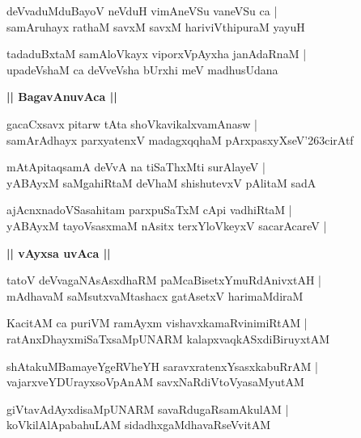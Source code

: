 \documentclass[twoside,12pt,openright]{book}
\def\S{\char'263}
\newcounter{shloka}[chapter]
\def\uvaca#1{\centerline{{\large\textbf{#1}}}}
\begin{document}
\begin{shloka}%
deVvaduMduBayoV neVduH vimAneVSu vaneVSu ca |\\
samAruhayx rathaM savxM savxM hariviVthipuraM yayuH 
\end{shloka}

\begin{shloka}%
tadaduBxtaM samAloVkayx viporxVpAyxha janAdaRnaM |\\
upadeVshaM ca deVveVsha bUrxhi meV madhusUdana
\end{shloka}

\uvaca{|| BagavAnuvAca ||}

\begin{shloka}%
gacaCxsavx pitarw tAta shoVkavikalxvamAnasw |\\
samArAdhayx parxyatenxV madagxqqhaM pArxpasxyXseV\S cirAtf 
\end{shloka}

\begin{shloka}%
mAtApitaqsamA deVvA na tiSaThxMti surAlayeV |\\
yABAyxM saMgahiRtaM deVhaM shishutevxV pAlitaM sadA 
\end{shloka}

\begin{shloka}%
ajAcnxnadoVSasahitam parxpuSaTxM cApi vadhiRtaM |\\
yABAyxM tayoVsasxmaM nAsitx terxYloVkeyxV sacarAcareV |
\end{shloka}

\uvaca{|| vAyxsa uvAca ||}

\begin{shloka}%
tatoV deVvagaNAsAsxdhaRM paMcaBisetxYmuRdAnivxtAH |\\
mAdhavaM saMsutxvaMtashacx gatAsetxV harimaMdiraM 
\end{shloka}

\begin{shloka}%
KacitAM ca puriVM  ramAyxm vishavxkamaRvinimiRtAM |\\
ratAnxDhayxmiSaTxsaMpUNARM kalapxvaqkASxdiBiruyxtAM 
\end{shloka}

\begin{shloka}%
shAtakuMBamayeYgeRVheYH saravxratenxYsasxkabuRrAM |\\
vajarxveYDUrayxsoVpAnAM savxNaRdiVtoVyasaMyutAM 
\end{shloka}

\begin{shloka}%
giVtavAdAyxdisaMpUNARM savaRdugaRsamAkulAM |\\
koVkilAlApabahuLAM sidadhxgaMdhavaRseVvitAM 
\end{shloka}
\end{document}
